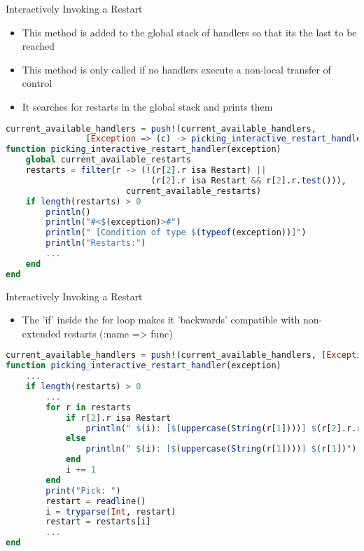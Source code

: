 \documentclass{beamer}
\begin{document}
\begin{frame}[fragile,t]{Interactively Invoking a Restart}

\begin{itemize}
    \item This method is added to the global stack of handlers so that its the last to be reached
    \item This method is only called if no handlers execute a non-local transfer of control
    \item It searches for restarts in the global stack and prints them
\end{itemize}
\vfill

\begin{lstlisting}[language=julia, style=jlcodestyle,]
current_available_handlers = push!(current_available_handlers,
                [Exception => (c) -> picking_interactive_restart_handler(c)])
function picking_interactive_restart_handler(exception)
    global current_available_restarts
    restarts = filter(r -> (!(r[2].r isa Restart) ||
                             (r[2].r isa Restart && r[2].r.test())),
                        current_available_restarts)
    if length(restarts) > 0
        println()
        println("#<$(exception)>#")
        println(" [Condition of type $(typeof(exception))]")
        println("Restarts:")
        ...
    end
end
\end{lstlisting}

\end{frame}
\begin{frame}[fragile,t]{Interactively Invoking a Restart}

\begin{itemize}
    \item The 'if' inside the for loop makes it 'backwards' compatible with non-extended restarts (:name => func)
\end{itemize}
\vfill

\begin{lstlisting}[language=julia, style=jlcodestyle,]
current_available_handlers = push!(current_available_handlers, [Exception => (c) -> picking_interactive_restart_handler(c)])
function picking_interactive_restart_handler(exception)
    ...
    if length(restarts) > 0
        ...
        for r in restarts
            if r[2].r isa Restart
                println(" $(i): [$(uppercase(String(r[1])))] $(r[2].r.report)")
            else
                println(" $(i): [$(uppercase(String(r[1])))] $(r[1])")
            end
            i += 1
        end
        print("Pick: ")
        restart = readline()
        i = tryparse(Int, restart)
        restart = restarts[i]
        ...
end
\end{lstlisting}
\end{frame}
\end{document}
